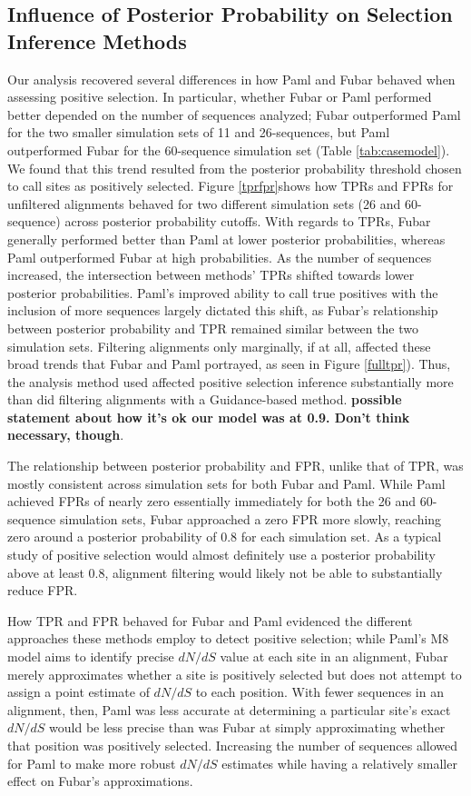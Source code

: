 \documentclass[10pt]{article}
\begin{document}
\subsection*{Influence of Posterior Probability on Selection Inference Methods}

Our analysis recovered several differences in how Paml and Fubar behaved when assessing positive selection. In particular, whether Fubar or Paml performed better depended on the number of sequences analyzed; Fubar outperformed Paml for the two smaller simulation sets of 11 and 26-sequences, but Paml outperformed Fubar for the 60-sequence simulation set (Table \ref{tab:casemodel}). We found that this trend resulted from the posterior probability threshold chosen to call sites as positively selected. Figure \ref{tprfpr}shows how TPRs and FPRs for unfiltered alignments behaved for two different simulation sets (26 and 60-sequence) across posterior probability cutoffs. With regards to TPRs,
Fubar generally performed better than Paml at lower posterior probabilities, whereas Paml outperformed Fubar at high probabilities. As the number of sequences increased, the intersection between methods' TPRs shifted towards lower posterior probabilities. Paml's improved ability to call true positives with the inclusion of more sequences largely dictated this shift, as Fubar's relationship between posterior probability and TPR remained similar between the two simulation sets.  Filtering alignments only marginally, if at all, affected these broad trends that Fubar and Paml portrayed, as seen in Figure \ref{fulltpr}). Thus, the analysis method used affected positive selection inference substantially more than did filtering  alignments with a Guidance-based method. \textbf{possible statement about how it's ok our model was at 0.9. Don't think necessary, though}.

The relationship between posterior probability and FPR, unlike that of TPR, was mostly consistent across simulation sets for both Fubar and Paml. While Paml achieved FPRs of nearly zero essentially immediately for both the 26 and 60-sequence simulation sets, Fubar approached a zero FPR more slowly, reaching zero around a posterior probability of 0.8 for each simulation set. As a typical study of positive selection would almost definitely use a posterior probability above at least 0.8, alignment filtering would likely not be able to substantially reduce FPR.

How TPR and FPR behaved for Fubar and Paml evidenced the different approaches these methods employ to detect positive selection; while Paml's M8 model aims to identify precise $dN/dS$ value at each site in an alignment, Fubar merely approximates whether a site is positively selected but does not attempt to assign a point estimate of $dN/dS$ to each position. With fewer sequences in an alignment, then, Paml was less accurate at determining  a particular site's exact $dN/dS$ would be less precise than was Fubar at simply approximating whether that position was positively selected. Increasing the number of sequences allowed for Paml to make more robust $dN/dS$ estimates while having a relatively smaller effect on Fubar's approximations.
\end{document}
